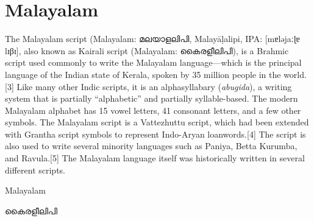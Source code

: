 \section{Malayalam}
\label{sec:malayam}
\newfontfamily{}

\def\malamtext#1{{\malayam#1}}

The Malayalam script (Malayalam: \malamtext{മലയാളലിപി}, Malayāḷalipi, IPA: [mɐləjaːɭɐ lɪβɪ], also known as Kairali script (Malayalam: \malamtext{കൈരളീലിപി}), is a Brahmic script used commonly to write the Malayalam language—which is the principal language of the Indian state of Kerala, spoken by 35 million people in the world.[3] Like many other Indic scripts, it is an alphasyllabary (\textit{abugida}), a writing system that is partially “alphabetic” and partially syllable-based. The modern Malayalam alphabet has 15 vowel letters, 41 consonant letters, and a few other symbols. The Malayalam script is a Vattezhuttu script, which had been extended with Grantha script symbols to represent Indo-Aryan loanwords.[4] The script is also used to write several minority languages such as Paniya, Betta Kurumba, and Ravula.[5] The Malayalam language itself was historically written in several different scripts.

\begin{scriptexample}[]{Malayalam}
\centerline{\Huge\malamtext{കൈരളീലിപി}}
\end{scriptexample}